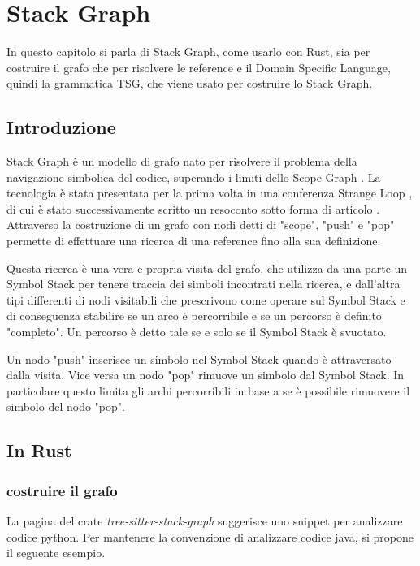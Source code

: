 \chapter{Stack Graph}

In questo capitolo si parla di Stack Graph, come usarlo con Rust, sia per costruire il grafo che per risolvere le reference e il Domain Specific Language, quindi la grammatica TSG, che viene usato per costruire lo Stack Graph.

\section{Introduzione}

Stack Graph \cite{StackGraph} \`e un modello di grafo nato per risolvere il problema della navigazione simbolica del codice, superando i limiti dello Scope Graph \cite{ScopeGraph}.
La tecnologia \`e stata presentata per la prima volta in una conferenza Strange Loop \cite{StackGraphConference}, di cui \`e stato successivamente scritto un resoconto sotto forma di articolo \cite{StackGraphIntro}.
Attraverso la costruzione di un grafo con nodi detti di "scope", "push" e "pop" permette di effettuare una ricerca di una reference fino alla sua definizione.

Questa ricerca \`e una vera e propria visita del grafo, che utilizza da una parte un Symbol Stack per tenere traccia dei simboli incontrati nella ricerca, e dall'altra tipi differenti di nodi visitabili che prescrivono come operare sul Symbol Stack e di conseguenza stabilire se un arco \`e percorribile e se un percorso \`e definito "completo".
Un percorso \`e detto tale se e solo se il Symbol Stack \`e svuotato.

Un nodo "push" inserisce un simbolo nel Symbol Stack quando \`e attraversato dalla visita.
Vice versa un nodo "pop" rimuove un simbolo dal Symbol Stack.
In particolare questo limita gli archi percorribili in base a se \`e possibile rimuovere il simbolo del nodo "pop".

\section{In Rust}

\subsection{costruire il grafo}

La pagina del crate \emph{tree-sitter-stack-graph} \cite{TreeSitterStackGraph} suggerisce uno snippet per analizzare codice python.
Per mantenere la convenzione di analizzare codice java, si propone il seguente esempio.

